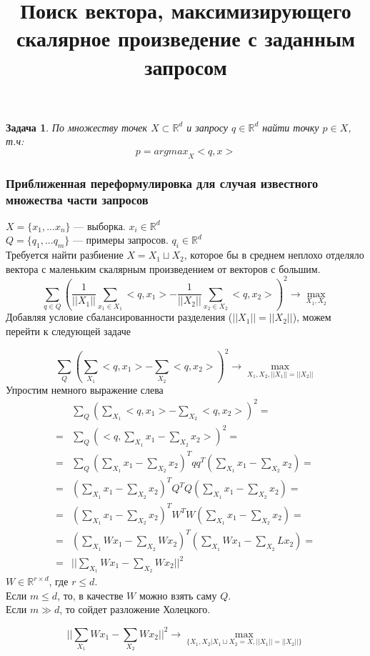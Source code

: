 \documentclass[a4paper, 12pt]{article}
\title{Поиск вектора, максимизирующего скалярное произведение с заданным запросом}
\date{}
\theoremstyle{plain}
\theoremstyle{problem}
\newtheorem{problem}{Задача}
\begin{document}
\maketitle
\begin{problem}
По множеству точек $X \subset \mathbb{R}^d$ и запросу $q \in \mathbb{R}^d$ найти точку $p \in X$, т.ч:
$$p = \textit{argmax}_{X}{<q, x>}$$
\end{problem}


\subsubsection*{Приближенная переформулировка для случая известного множества части запросов}
$X = \{x_1, ... x_n\}$ --- выборка. $x_i \in \mathbb{R}^d$\\
$Q = \{q_1, ... q_m\}$ --- примеры запросов. $q_i \in \mathbb{R}^d$\\
Требуется найти разбиение $X = X_1 \sqcup X_2$, которое бы в среднем неплохо отделяло вектора с маленьким скалярным произведением от векторов с большим.
$$\sum_{q \in Q}\left(\frac{1}{||X_1||}\sum_{x_1 \in X_1}<q,x_1> - \frac{1}{||X_2||}\sum_{x_2 \in X_2}<q, x_2>\right)^2 \longrightarrow \max_{X_1, X_2}$$
Добавляя условие сбалансированности разделения ($||X_1|| = ||X_2||$), можем перейти к следующей задаче

$$\sum_{Q}\left(\sum_{X_1}<q,x_1> - \sum_{X_2}<q, x_2>\right)^2 \longrightarrow \max_{X_1, X_2, ||X_1|| = ||X_2||}$$
Упростим немного выражение слева
\begin{align*}
&\sum_{Q}\left(\sum_{X_1}<q,x_1> - \sum_{X_2}<q, x_2>\right)^2  =\\= 
&\sum_Q\left(<q, \sum_{X_1}x_1 - \sum_{X_2}x_2>\right)^2 =\\=
&\sum_Q (\sum_{X_1}x_1 - \sum_{X_2}x_2)^Tqq^T(\sum_{X_1}x_1 - \sum_{X_2}x_2) =\\=
&(\sum_{X_1}x_1 - \sum_{X_2}x_2)^TQ^TQ(\sum_{X_1}x_1 - \sum_{X_2}x_2) = \\=
&(\sum_{X_1}x_1 - \sum_{X_2}x_2)^TW^TW(\sum_{X_1}x_1 - \sum_{X_2}x_2) = \\=
&(\sum_{X_1}Wx_1 - \sum_{X_2}Wx_2)^T(\sum_{X_1}Wx_1 - \sum_{X_2}Lx_2) = \\=
&||\sum_{X_1}Wx_1 - \sum_{X_2}Wx_2||^2 
\end{align*}
$W \in \mathbb{R}^{r \times d}$, где $r \leq d$.\\
Если $m \leq d$, то, в качестве $W$ можно взять саму $Q$. \\
Если $m \gg d$, то сойдет разложение Холецкого.
\begin{tcolorbox}
$$||\sum_{X_1}Wx_1 - \sum_{X_2}Wx_2||^2\longrightarrow \max_{\{X_1, X_2 | X_1 \sqcup X_2 = X, ||X_1|| = ||X_2||\}}$$
\end{tcolorbox}
\end{document}
